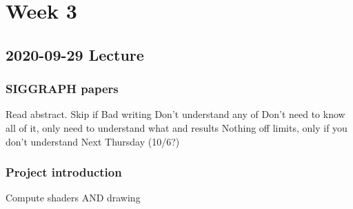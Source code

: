 \chapter{Week 3}

\section{2020-09-29 Lecture}

\subsection{SIGGRAPH papers}

\begin{outline}
    \1 Read abstract. Skip if
        \2 Bad writing
        \2 Don't understand any of 
    \1 Don't need to know all of it, only need to understand what and results
    \1 Nothing off limits, only if you don't understand
    \1 Next Thursday (10/6?)
\end{outline}

\subsection{Project introduction}

\begin{outline}
    \1 Compute shaders AND drawing
\end{outline}